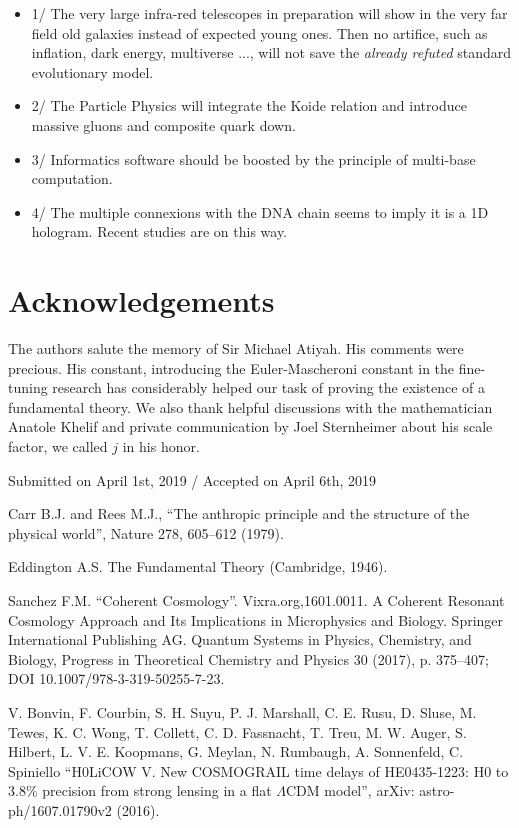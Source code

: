 \documentclass[twoside,draft]{article}
\begin{document}
\begin{sloppypar}
{\begin{itemize}
      This article leads to some predictions:
\item 1/  The very large infra-red telescopes in preparation will show in the very far field old galaxies instead of expected young ones. Then no artifice, such as inflation, dark energy, multiverse ..., will not save the \textit{already refuted} standard evolutionary model.
\item 2/ The Particle Physics will integrate the Koide relation and introduce massive gluons and composite quark down.
\item 3/ Informatics software should  be boosted by the principle of multi-base computation.
\item 4/ The multiple connexions with the DNA chain seems to imply it is a 1D hologram. Recent studies \cite{Widom} are on this way. 
\end{itemize}


\section*{Acknowledgements}
The authors salute the memory of Sir Michael Atiyah. His comments were precious. His constant, introducing the Euler-Mascheroni constant in the fine-tuning research has considerably helped our task
of proving the existence of a fundamental theory. We also thank helpful discussions with the 
mathematician Anatole Khelif and private communication by Joel Sternheimer about his scale factor, 
we called $j$ in his honor.
%
\begin{flushright}\footnotesize
Submitted on April 1st, 2019 / Accepted on April 6th, 2019
\end{flushright}


\begin{thebibliography}{99}\footnotesize

 Carr B.J. and Rees M.J., ``The anthropic principle and the
structure of the physical world'', Nature 278, 605--612 (1979).

 Eddington A.S. The Fundamental Theory (Cambridge, 1946).

 Sanchez F.M. ``Coherent Cosmology''. Vixra.org,1601.0011. A Coherent Resonant Cosmology Approach and Its Implications in Microphysics and Biology. Springer
International Publishing AG. Quantum Systems in
Physics, Chemistry, and Biology, Progress in Theoretical Chemistry and Physics
30 (2017), p. 375--407; DOI 10.1007/978-3-319-50255-7-23.

 V. Bonvin, F. Courbin, S. H. Suyu, P. J. Marshall, C. E. Rusu, D. Sluse, M. Tewes, K. C. Wong, T. Collett, C. D. Fassnacht, T. Treu, M. W. Auger, S. Hilbert, L. V. E. Koopmans, G. Meylan, N. Rumbaugh, A. Sonnenfeld, C. Spiniello ``H0LiCOW V. New COSMOGRAIL time delays of HE0435-1223: H0 to 3.8\% precision from strong lensing in a flat $\Lambda$CDM model'', arXiv: astro-ph/1607.01790v2 (2016).


\end{thebibliography}}
\end{sloppypar}
\end{document}
